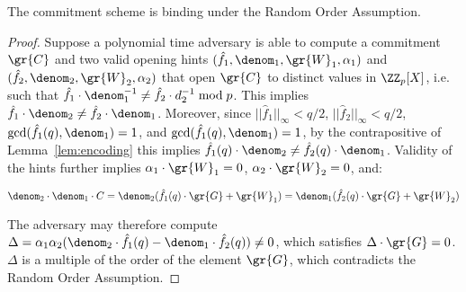 \begin{lemma}
\label{lem:aug-com-binding}
	The commitment scheme is binding under the Random Order Assumption. 
\end{lemma}
\begin{proof}
	Suppose a polynomial time adversary is able to compute a commitment $\gr{C}$ and two valid opening hints $(\hat{f}_1, \denom_1, \gr{W}_1, \alpha_1)$ and $(\hat{f}_2, \denom_2, \gr{W}_2, \alpha_2)$ that open $\gr{C}$ to distinct values in $\ZZ_p[X]$, i.e. such that $\hat{f}_1 \cdot \denom_1^{-1} \neq \hat{f}_2 \cdot d_2^{-1} \bmod p$. 
	This implies $\hat{f}_1 \cdot \denom_2 \neq \hat{f}_2 \cdot \denom_1$. Moreover, since $||\hat{f}_1||_\infty < q/2$, $||\hat{f}_2||_\infty < q/2$, $\gcd(\hat{f}_1(q), \denom_1) = 1$, and $\gcd(\hat{f}_1(q), \denom_1) = 1$, by the contrapositive of Lemma~\ref{lem:encoding} this implies $\hat{f}_1(q) \cdot \denom_2 \neq \hat{f}_2(q) \cdot \denom_1$. Validity of the hints further implies $\alpha_1 \cdot \gr{W}_1 = 0$, $\alpha_2 \cdot \gr{W}_2 = 0$, and: 
	
	$$\denom_2 \cdot \denom_1 \cdot C = \denom_2 (\hat{f}_1(q) \cdot \gr{G} + \gr{W}_1) = \denom_1(\hat{f}_2(q) \cdot \gr{G} + \gr{W}_2)$$ 
	
	The adversary may therefore compute $\Delta = \alpha_1 \alpha_2 (\denom_2 \cdot \hat{f}_1(q)  - \denom_1 \cdot \hat{f}_2(q)) \neq 0$, which satisfies $\Delta \cdot \gr{G} = 0$. $\Delta$ is a multiple of the order of the element $\gr{G}$, which contradicts the Random Order Assumption. 
\end{proof}